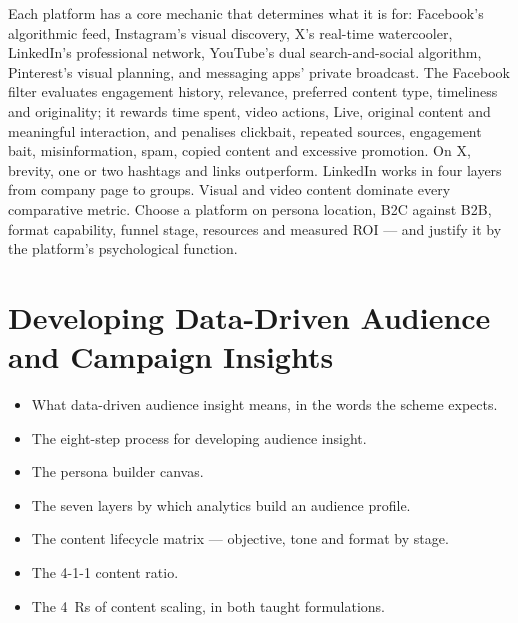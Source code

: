 \documentclass{MMTextbook}
\begin{document}
\begin{summarybox}
Each platform has a core mechanic that determines what it is for: Facebook's
algorithmic feed, Instagram's visual discovery, X's real-time watercooler,
LinkedIn's professional network, YouTube's dual search-and-social algorithm,
Pinterest's visual planning, and messaging apps' private broadcast. The Facebook
filter evaluates engagement history, relevance, preferred content type,
timeliness and originality; it rewards time spent, video actions, Live, original
content and meaningful interaction, and penalises clickbait, repeated sources,
engagement bait, misinformation, spam, copied content and excessive promotion.
On X, brevity, one or two hashtags and links outperform. LinkedIn works in four
layers from company page to groups. Visual and video content dominate every
comparative metric. Choose a platform on persona location, B2C against B2B,
format capability, funnel stage, resources and measured ROI --- and justify it
by the platform's psychological function.
\end{summarybox}

\chapter{Developing Data-Driven Audience and Campaign Insights}


\begin{learningoutcomes}
\begin{itemize}
\item What data-driven audience insight means, in the words the scheme expects.
\item The eight-step process for developing audience insight.
\item The persona builder canvas.
\item The seven layers by which analytics build an audience profile.
\item The content lifecycle matrix --- objective, tone and format by stage.
\item The 4-1-1 content ratio.
\item The 4~Rs of content scaling, in both taught formulations.
\end{itemize}
\end{learningoutcomes}
\end{document}
